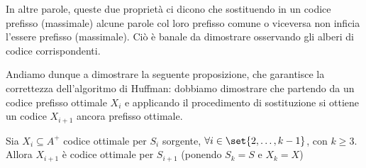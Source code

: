 In altre parole, queste due proprietà ci dicono che sostituendo in un codice prefisso (massimale) alcune parole col loro prefisso comune o viceversa non inficia l'essere prefisso (massimale).
Ciò è banale da dimostrare osservando gli alberi di codice corrispondenti.

Andiamo dunque a dimostrare la seguente proposizione, che garantisce la correttezza dell'algoritmo di Huffman: dobbiamo dimostrare che partendo da un codice prefisso ottimale $X_i$ e applicando il procedimento di sostituzione si ottiene un codice $X_{i+1}$ ancora prefisso ottimale.

\begin{proposition}{}
  Sia \(X_i \subseteq A^+\) codice ottimale per \(S_i\) sorgente, \(\forall i \in \set{2,\ldots,k-1}\), con \(k \geq 3\).
  Allora \(X_{i+1}\) è codice ottimale per \(S_{i+1}\) (ponendo \(S_k=S\) e \(X_k = X\))
\end{proposition}


